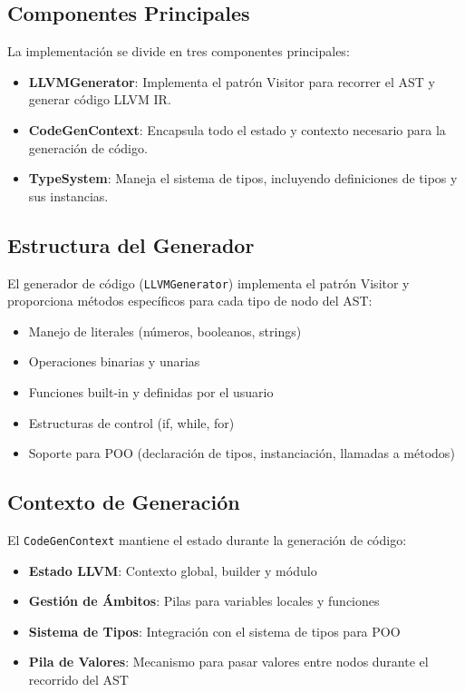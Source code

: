 \documentclass[11pt, a4paper, twoside]{article} %
\begin{document}
\subsection{Componentes Principales}

La implementación se divide en tres componentes principales:

\begin{itemize}
    \item \textbf{LLVMGenerator}: Implementa el patrón Visitor para recorrer el AST y generar código LLVM IR.
    \item \textbf{CodeGenContext}: Encapsula todo el estado y contexto necesario para la generación de código.
    \item \textbf{TypeSystem}: Maneja el sistema de tipos, incluyendo definiciones de tipos y sus instancias.
\end{itemize}

\subsection{Estructura del Generador}

El generador de código (\texttt{LLVMGenerator}) implementa el patrón Visitor y proporciona métodos específicos para cada tipo de nodo del AST:

\begin{itemize}
    \item Manejo de literales (números, booleanos, strings)
    \item Operaciones binarias y unarias
    \item Funciones built-in y definidas por el usuario
    \item Estructuras de control (if, while, for)
    \item Soporte para POO (declaración de tipos, instanciación, llamadas a métodos)
\end{itemize}

\subsection{Contexto de Generación}

El \texttt{CodeGenContext} mantiene el estado durante la generación de código:

\begin{itemize}
    \item \textbf{Estado LLVM}: Contexto global, builder y módulo
    \item \textbf{Gestión de Ámbitos}: Pilas para variables locales y funciones
    \item \textbf{Sistema de Tipos}: Integración con el sistema de tipos para POO
    \item \textbf{Pila de Valores}: Mecanismo para pasar valores entre nodos durante el recorrido del AST
\end{itemize}
\end{document}
